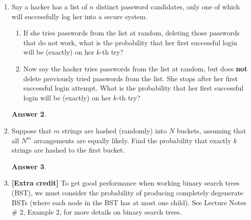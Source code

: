 \documentclass[12pt]{article}
\renewcommand{\(}{\left(}
\renewcommand{\)}{\right)}
\theoremstyle{definition}
\newtheorem*{answer}{Answer}
\begin{document}
\begin{enumerate}
    \begin{shaded}
    \begin{answer}

    \end{answer}
    \end{shaded}
    \newpage


\item Say a hacker has a list of $n$ distinct password candidates, only one of which will successfully log her into a secure system.
    \begin{enumerate}[label=\alph*.]

    \item If she tries passwords from the list at random, deleting those passwords that do not work, what is the probability that her first successful login will be (exactly) on her $k$-th try?
    \item Now say the hacker tries passwords from the list at random, but does \textbf{not} delete previously tried passwords from the list. She stops after her first successful login attempt.  What is the probability that her first successful login will be (exactly) on her $k$-th try?

    \end{enumerate}

    \begin{shaded}
    \begin{answer}

    \end{answer}
    \end{shaded}
    \newpage


\item Suppose that $m$ strings are hashed (randomly) into $N$ buckets, assuming that all $N^m$ arrangements are equally likely.  Find the probability that exactly $k$ strings are hashed to the first bucket.

    \begin{shaded}
    \begin{answer}

    \end{answer}
    \end{shaded}
    \newpage


\item \textbf{[Extra credit]} To get good performance when working binary search trees (BST), we must consider the probability of producing completely degenerate BSTs (where each node in the BST has at most one child). See Lecture Notes \# 2, Example 2, for more details on binary search trees.
    \begin{enumerate}[label=\alph*.]


\end{enumerate}
\end{enumerate}
\end{document}
